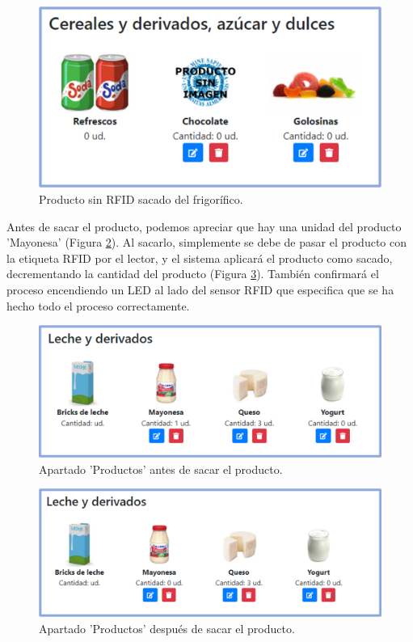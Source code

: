 \begin{figure}[h] 
    \centering
    \includegraphics[width=.70\textwidth]{capitulos/capitulo10/sacar/2.png}
    \caption{Producto sin RFID sacado del frigorífico.}
    \label{fig:s2}
\end{figure}

Antes de sacar el producto, podemos apreciar que hay una unidad del producto 'Mayonesa' (Figura \ref{fig:s3}). Al sacarlo, simplemente se debe de pasar el producto con la etiqueta RFID por el lector, y el sistema aplicará el producto como sacado, decrementando la cantidad del producto (Figura \ref{fig:s4}). También confirmará el proceso encendiendo un LED al lado del sensor RFID que especifica que se ha hecho todo el proceso correctamente.

\begin{figure}[h] 
    \centering
    \includegraphics[width=.80\textwidth]{capitulos/capitulo10/sacar/3.png}
    \caption{Apartado 'Productos' antes de sacar el producto.}
    \label{fig:s3}
\end{figure}
\begin{figure}[h] 
    \centering
    \includegraphics[width=.80\textwidth]{capitulos/capitulo10/sacar/4.png}
    \caption{Apartado 'Productos' después de sacar el producto.}
    \label{fig:s4}
\end{figure}

